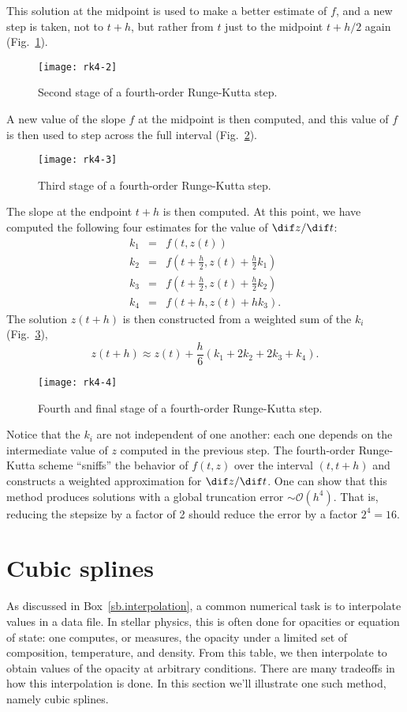 This solution at the midpoint is used to make a better estimate of $f$, and a new step is taken, not to $t+h$, but rather from $t$ just to the midpoint $t+h/2$ again (Fig.~\ref{f.rk4-2}).
\begin{figure}
\texttt{[image: rk4-2]}
\caption{Second stage of a fourth-order Runge-Kutta step.\label{f.rk4-2}}
\end{figure}

A new value of the slope $f$ at the midpoint is then computed, and this value of $f$ is then used to step across the full interval (Fig.~\ref{f.rk4-3}).
\begin{figure}
\texttt{[image: rk4-3]}
\caption{Third stage of a fourth-order Runge-Kutta step.\label{f.rk4-3}}
\end{figure}

The slope at the endpoint $t+h$ is then computed. At this point, we have computed the following four estimates for the value of $\dif z/\dif t$:
\begin{eqnarray}
k_{1} &=& f(t,z(t)) \\
k_{2} &=& f\left(t+\frac{h}{2}, z(t) + \frac{h}{2}k_{1}\right)\\
k_{3} &=& f\left(t+\frac{h}{2},z(t) + \frac{h}{2}k_{2}\right)\\
k_{4} &=& f\left(t + h, z(t) + hk_{3}\right).
\end{eqnarray}
The solution $z(t+h)$ is then constructed from a weighted sum of the $k_{i}$ (Fig.~\ref{f.rk4-4}),
\begin{equation}\label{e.rk4}
	z(t+h) \approx z(t) + \frac{h}{6}\left(k_{1} + 2k_{2} + 2k_{3} + k_{4}\right).
\end{equation}
\begin{figure}
\texttt{[image: rk4-4]}
\caption{Fourth and final stage of a fourth-order Runge-Kutta step.\label{f.rk4-4}}
\end{figure}

Notice that the $k_{i}$ are not independent of one another: each one depends on the intermediate value of $z$ computed in the previous step. The fourth-order Runge-Kutta scheme ``sniffs'' the behavior of $f(t,z)$ over the interval $(t,t+h)$ and constructs a weighted approximation for $\dif z/\dif t$.  One can show that this method produces solutions with a global truncation error $\sim\mathcal{O}(h^{4})$. That is, reducing the stepsize by a factor of 2 should reduce the error by a factor $2^{4} = 16$.

\section{Cubic splines}
As discussed in Box~\ref{sb.interpolation}, a common numerical task is to interpolate values in a data file. In stellar physics, this is often done for opacities or equation of state: one computes, or measures, the opacity under a limited set of composition, temperature, and density. From this table, we then interpolate to obtain values of the opacity at arbitrary conditions. There are many tradeoffs in how this interpolation is done. In this section we'll illustrate one such method, namely cubic splines.


